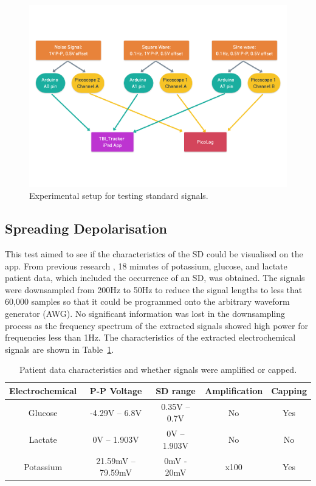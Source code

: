 \begin{figure}[h!]
\centering
\includegraphics[trim={0cm 3.5cm 0cm  3.5cm}, clip, width=1\textwidth]{./figures/test1.pdf}
\captionsetup{justification=centering}
\caption{Experimental setup for testing standard signals.}
\label{fig: test1}
\end{figure}


\subsection{Spreading Depolarisation}
This test aimed to see if the characteristics of the SD could be visualised on the app. From previous research \cite{Rogers2017}, 18 minutes of potassium, glucose, and lactate patient data, which included the occurrence of an SD, was obtained. The signals were downsampled from 200Hz to 50Hz to reduce the signal lengths to less that 60,000 samples so that it could be programmed onto the arbitrary waveform generator (AWG). No significant information was lost in the downsampling process as the frequency spectrum of the extracted signals showed high power for frequencies less than 1Hz. The characteristics of the extracted electrochemical signals are shown in Table~\ref{table: patient data}. 


\begin{table}[h!]
\centering
\begin{tabular}{||c c c c c||} 
 \hline
 Electrochemical & P-P Voltage & SD range & Amplification & Capping\\ [0.5ex] 
 \hline\hline
 Glucose & -4.29V -- 6.8V & 0.35V -- 0.7V & No & Yes \\
 Lactate & 0V -- 1.903V & 0V -- 1.903V & No & No \\
 Potassium & 21.59mV -- 79.59mV & 0mV - 20mV & x100 & Yes \\
 \hline
\end{tabular}
\caption{Patient data characteristics and whether signals were amplified or capped.}
\label{table: patient data}
\end{table}

